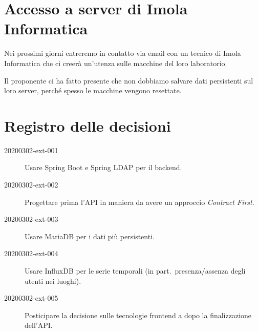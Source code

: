 \documentclass{article}
\begin{document}


\section{Accesso a server di Imola Informatica}%
\label{sec:accesso_a_server_di_imola_informatica}

Nei prossimi giorni entreremo in contatto via email con un tecnico di Imola Informatica che ci creerà un'utenza sulle macchine del loro laboratorio.

Il proponente ci ha fatto presente che non dobbiamo salvare dati persistenti sul loro server, perché spesso le macchine vengono resettate.


\newpage
\section{Registro delle decisioni}%
\label{sec:registro_delle_decisioni}

\begin{description}
  \item[20200302-ext-001] Usare Spring Boot e Spring LDAP per il backend.
  \item[20200302-ext-002] Progettare prima l'API in maniera da avere un approccio \textit{Contract First}.
  \item[20200302-ext-003] Usare MariaDB per i dati più persistenti.
  \item[20200302-ext-004] Usare InfluxDB per le serie temporali (in part.\ presenza/assenza degli utenti nei luoghi).
  \item[20200302-ext-005] Posticipare la decisione sulle tecnologie frontend a dopo la finalizzazione dell'API\@.
\end{description}
\end{document}
